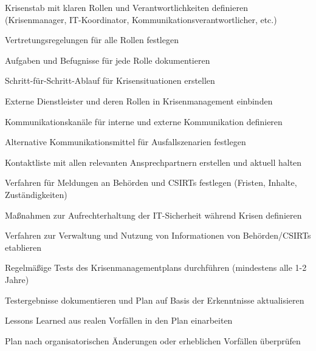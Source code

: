 \begin{checklist}
    \item Krisenstab mit klaren Rollen und Verantwortlichkeiten definieren (Krisenmanager, IT-Koordinator, Kommunikationsverantwortlicher, etc.)
    \item Vertretungsregelungen für alle Rollen festlegen
    \item Aufgaben und Befugnisse für jede Rolle dokumentieren
    \item Schritt-für-Schritt-Ablauf für Krisensituationen erstellen
    \item Externe Dienstleister und deren Rollen in Krisenmanagement einbinden
    \item Kommunikationskanäle für interne und externe Kommunikation definieren
    \item Alternative Kommunikationsmittel für Ausfallszenarien festlegen
    \item Kontaktliste mit allen relevanten Ansprechpartnern erstellen und aktuell halten
    \item Verfahren für Meldungen an Behörden und CSIRTs festlegen (Fristen, Inhalte, Zuständigkeiten)
    \item Maßnahmen zur Aufrechterhaltung der IT-Sicherheit während Krisen definieren
    \item Verfahren zur Verwaltung und Nutzung von Informationen von Behörden/CSIRTs etablieren
    \item Regelmäßige Tests des Krisenmanagementplans durchführen (mindestens alle 1-2 Jahre)
    \item Testergebnisse dokumentieren und Plan auf Basis der Erkenntnisse aktualisieren
    \item Lessons Learned aus realen Vorfällen in den Plan einarbeiten
    \item Plan nach organisatorischen Änderungen oder erheblichen Vorfällen überprüfen
\end{checklist}

